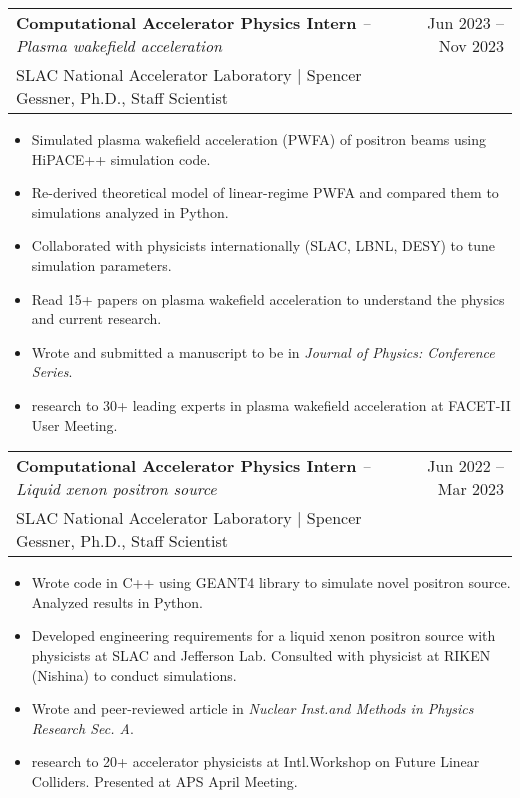 \documentclass[a4paper,11pt]{article}
\makeatletter
\newcommand{\colhref}[3]{\href{#2}{\color{#1}{#3}}} %
\newenvironment{jobcustomlong}[4]
    {
    \begin{tabularx}{\linewidth}{@{}l X r@{}}
    \textbf{#1} \textit{#2} & \hfill &  #3 \\[-2.5pt]
    \textcolor{black!55!white}{\small #4} \\[2.5pt]
    \end{tabularx}
    \begin{minipage}[t]{\linewidth}
    \begin{itemize}[nosep,after=\strut, leftmargin=1.75em, itemsep=1pt,label={\small$\bullet$}]
    }
    {
    \end{itemize} \vspace{.325em}
    \end{minipage}   
    }
\makeatother
\begin{document}
\begin{jobcustomlong}{Computational Accelerator Physics Intern}{-- Plasma wakefield acceleration}{Jun 2023 -- Nov 2023}{{SLAC} National Accelerator Laboratory $\vert$ Spencer Gessner, Ph.D., Staff Scientist}
    \item Simulated plasma wakefield acceleration (PWFA) of positron beams using {HiPACE++} simulation code.
    \item Re-derived theoretical model of linear-regime PWFA and compared them to simulations analyzed in Python.
    \item Collaborated with physicists internationally ({SLAC}, {LBNL}, {DESY}) to tune simulation parameters.
    \item Read 15+ papers on plasma wakefield acceleration to understand the physics and current research.
    \item Wrote and submitted a manuscript to be \colhref{blue!65!black}{https://arxiv.org/abs/2311.07087}{published} in \textit{Journal of Physics: Conference Series}.
    \item \colhref{blue!65!black}{https://docs.google.com/presentation/d/1dLFNB72h5O4ACa0lj33pgTrrmjeLWT7p04UOhfNXdBw/edit?usp=sharing}{Presented} research to 30+ leading experts in plasma wakefield acceleration at FACET-II User Meeting.
\end{jobcustomlong}
\begin{jobcustomlong}{Computational Accelerator Physics Intern}{-- Liquid xenon positron source}{Jun 2022 -- Mar 2023}{{SLAC} National Accelerator Laboratory $\vert$ Spencer Gessner, Ph.D., Staff Scientist}
    \item Wrote code in C++ using GEANT4 library to simulate novel positron source. Analyzed results in Python.
    \item Developed engineering requirements for a liquid xenon positron source with physicists at {SLAC} and  Jefferson Lab. Consulted with physicist at {RIKEN} (Nishina) to conduct simulations.
    \item Wrote and \colhref{blue!65!black}{http://dx.doi.org/10.1016/j.nima.2023.168329}{published} peer-reviewed article in \textit{Nuclear Inst.\!\;and Methods in Physics Research Sec. A}.
    \item \colhref{blue!65!black}{https://docs.google.com/presentation/d/1vRQo0vVH0A9cEBvVVeSKDu2MXw4V9R3hdnxamKaW3T0/edit?usp=sharing}{Presented} research to 20+ accelerator physicists at Intl.\!\;Workshop on Future Linear Colliders. Presented \colhref{blue!65!black}{https://drive.google.com/file/d/1iXObaHtb2xi4kYt638eMDfPBv-0eD-CW/view?usp=sharing}{poster} at APS April Meeting.
\end{jobcustomlong}
\end{document}
